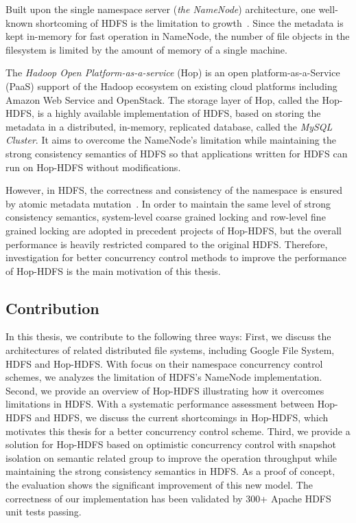 \documentclass[runningheads,a4paper]{llncs}
\begin{document}
Built upon the single namespace server (\textit{the NameNode}) architecture, one well-known shortcoming of HDFS is the limitation to growth~\cite{shvachko2010hdfs}. Since the metadata is kept in-memory for fast operation in NameNode, the number of file objects in the filesystem is limited by the amount of memory of a single machine.

The \textit{Hadoop Open Platform-as-a-service} (Hop) is an open platform-as-a-Service (PaaS) support of the Hadoop ecosystem on existing cloud platforms including Amazon Web Service and OpenStack. The storage layer of Hop, called the Hop-HDFS, is a highly available implementation of HDFS, based on storing the metadata in a distributed, in-memory, replicated database, called the \textit{MySQL Cluster}. It aims to overcome the NameNode's limitation while maintaining the strong consistency semantics of HDFS so that applications written for HDFS can run on Hop-HDFS without modifications.

However, in HDFS, the correctness and consistency of the namespace is ensured by atomic metadata mutation~\cite{shvachko2010hadoop}. In order to maintain the same level of strong consistency semantics, system-level coarse grained locking and row-level fine grained locking are adopted in precedent projects of Hop-HDFS, but the overall performance is heavily restricted compared to the original HDFS. Therefore, investigation for better concurrency control methods to improve the performance of Hop-HDFS is the main motivation of this thesis.

\subsection*{Contribution}
In this thesis, we contribute to the following three ways: First, we discuss the architectures of related distributed file systems, including Google File System, HDFS and Hop-HDFS. With focus on their namespace concurrency control schemes, we analyzes the limitation of HDFS's NameNode implementation. Second, we provide an overview of Hop-HDFS illustrating how it overcomes limitations in HDFS. With a systematic performance assessment between Hop-HDFS and HDFS, we discuss the current shortcomings in Hop-HDFS, which motivates this thesis for a better concurrency control scheme. Third, we provide a solution for Hop-HDFS based on optimistic concurrency control with snapshot isolation on semantic related group to improve the operation throughput while maintaining the strong consistency semantics in HDFS. As a proof of concept, the evaluation shows the significant improvement of this new model. The correctness of our implementation has been validated by 300+ Apache HDFS unit tests passing.
\end{document}
